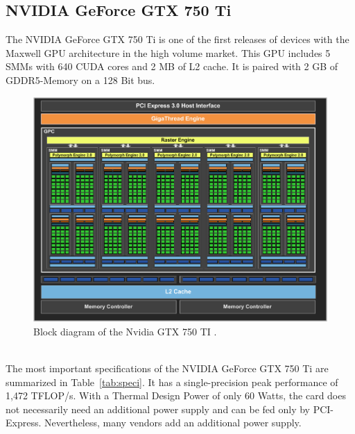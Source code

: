 \documentclass[american, hauptseminar, twoside]{zihpub}
\begin{document}
		\subsection{NVIDIA GeForce GTX 750 Ti}
		\label{sec:750}
			The NVIDIA GeForce GTX 750 Ti is one of the first releases of devices with the Maxwell GPU architecture in the high volume market. This GPU includes 5 SMMs with 640 CUDA cores and 2 MB of L2 cache. It is paired with 2 GB of GDDR5-Memory on a 128 Bit bus. 
			\begin{figure}[h]
				\begin{center}
					\includegraphics[width=1.0\textwidth]{grafiken/gtx750ti.png}
					\caption{Block diagram of the Nvidia GTX 750 TI \cite{Smith2014}.}
					\label{fig:750ti}
				\end{center}
			\end{figure}
			\\
			The most important specifications of the NVIDIA GeForce GTX 750 Ti are summarized in Table~\ref{tab:speci}. It has a single-precision peak performance of 1,472 TFLOP/s. With a Thermal Design Power of only 60 Watts, the card does not necessarily need an additional power supply and can be fed only by PCI-Express. Nevertheless, many vendors add an additional power supply.\cite{Smith2014}
\end{document}
